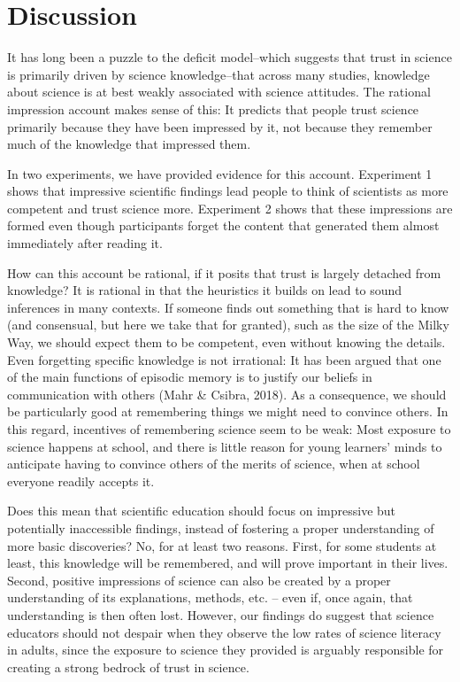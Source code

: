 \documentclass[
  doc,floatsintext]{apa6}
\begin{document}
\section{Discussion}\label{discussion}

It has long been a puzzle to the deficit model--which suggests that trust in science is primarily driven by science knowledge--that across many studies, knowledge about science is at best weakly associated with science attitudes. The rational impression account makes sense of this: It predicts that people trust science primarily because they have been impressed by it, not because they remember much of the knowledge that impressed them.

In two experiments, we have provided evidence for this account. Experiment 1 shows that impressive scientific findings lead people to think of scientists as more competent and trust science more. Experiment 2 shows that these impressions are formed even though participants forget the content that generated them almost immediately after reading it.

How can this account be rational, if it posits that trust is largely detached from knowledge? It is rational in that the heuristics it builds on lead to sound inferences in many contexts. If someone finds out something that is hard to know (and consensual, but here we take that for granted), such as the size of the Milky Way, we should expect them to be competent, even without knowing the details. Even forgetting specific knowledge is not irrational: It has been argued that one of the main functions of episodic memory is to justify our beliefs in communication with others (Mahr \& Csibra, 2018). As a consequence, we should be particularly good at remembering things we might need to convince others. In this regard, incentives of remembering science seem to be weak: Most exposure to science happens at school, and there is little reason for young learners' minds to anticipate having to convince others of the merits of science, when at school everyone readily accepts it.

Does this mean that scientific education should focus on impressive but potentially inaccessible findings, instead of fostering a proper understanding of more basic discoveries? No, for at least two reasons. First, for some students at least, this knowledge will be remembered, and will prove important in their lives. Second, positive impressions of science can also be created by a proper understanding of its explanations, methods, etc. -- even if, once again, that understanding is then often lost. However, our findings do suggest that science educators should not despair when they observe the low rates of science literacy in adults, since the exposure to science they provided is arguably responsible for creating a strong bedrock of trust in science.
\end{document}
